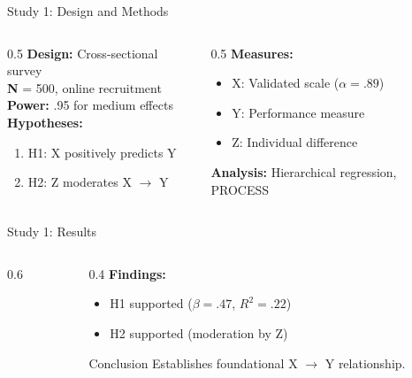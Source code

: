 \documentclass[aspectratio=169,12pt]{beamer}
\begin{document}
\begin{frame}{Study 1: Design and Methods}
  \begin{columns}[T]
    \begin{column}{0.5\textwidth}
      \textbf{Design:} Cross-sectional survey\\
      \textbf{N} = 500, online recruitment\\
      \textbf{Power:} .95 for medium effects\\[0.3cm]
      \textbf{Hypotheses:}
      \begin{enumerate}
        \item H1: X positively predicts Y
        \item H2: Z moderates X $\to$ Y
      \end{enumerate}
    \end{column}
    \begin{column}{0.5\textwidth}
      \textbf{Measures:}
      \begin{itemize}
        \item X: Validated scale ($\alpha = .89$)
        \item Y: Performance measure
        \item Z: Individual difference
      \end{itemize}
      \textbf{Analysis:} Hierarchical regression, PROCESS
    \end{column}
  \end{columns}
\end{frame}

\begin{frame}{Study 1: Results}
  \begin{columns}[c]
    \begin{column}{0.6\textwidth}
    \end{column}
    \begin{column}{0.4\textwidth}
      \textbf{Findings:}
      \begin{itemize}
        \item H1 supported ($\beta = .47$, $R^2 = .22$)
        \item H2 supported (moderation by Z)
      \end{itemize}
      \begin{block}{Conclusion}
        Establishes foundational X $\to$ Y relationship.
      \end{block}
    \end{column}
  \end{columns}
\end{frame}
\end{document}
